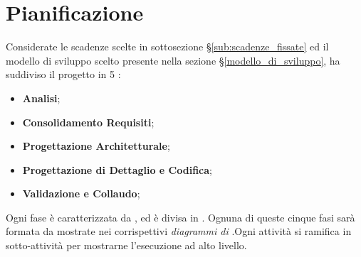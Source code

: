 \section{Pianificazione}
Considerate le scadenze scelte in sottosezione \S\ref{sub:scadenze_fissate} ed il modello di sviluppo scelto presente nella sezione \S\ref{modello_di_sviluppo}, {\Gruppo} ha suddiviso il progetto in 5 :
\begin{itemize}
    \item \textbf{Analisi};
    \item \textbf{Consolidamento Requisiti};
    \item \textbf{Progettazione Architetturale};
    \item \textbf{Progettazione di Dettaglio e Codifica};
    \item \textbf{Validazione e Collaudo};
\end{itemize}
 Ogni fase è caratterizzata da ,  ed è divisa in . Ognuna di queste cinque fasi sarà formata da  mostrate nei corrispettivi \textit{diagrammi di }.Ogni attività si ramifica in sotto-attività per mostrarne l'esecuzione ad alto livello.


\newpage

\newpage

\newpage

\newpage

\newpage
